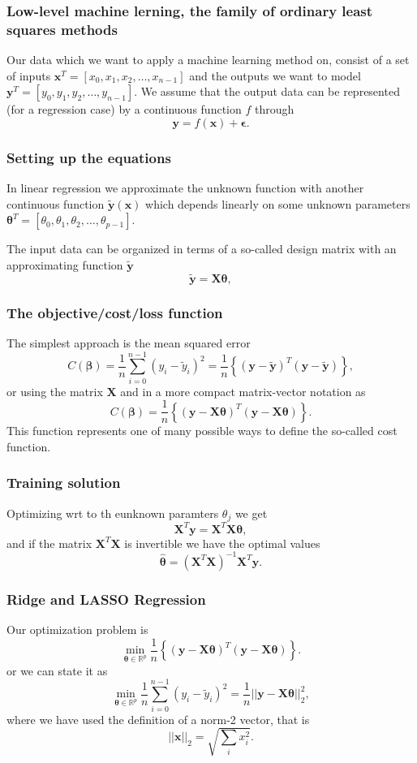 \documentclass{beamer}
\begin{document}
\begin{frame}
\frametitle{Low-level machine lerning, the family of ordinary least squares methods}

Our data which we want to apply a machine learning method on, consist
of a set of inputs $\bm{x}^T=[x_0,x_1,x_2,\dots,x_{n-1}]$ and the
outputs we want to model $\bm{y}^T=[y_0,y_1,y_2,\dots,y_{n-1}]$.
We assume  that the output data can be represented (for a regression case) by a continuous function $f$
through
\[
\bm{y}=f(\bm{x})+\bm{\epsilon}.
\]
\end{frame}

\begin{frame}
\frametitle{Setting up the equations}

In linear regression we approximate the unknown function with another
continuous function $\tilde{\bm{y}}(\bm{x})$ which depends linearly on
some unknown parameters
$\bm{\theta}^T=[\theta_0,\theta_1,\theta_2,\dots,\theta_{p-1}]$.

The input data can be organized in terms of a so-called design matrix 
with an approximating function $\bm{\tilde{y}}$ 
\[
\bm{\tilde{y}}= \bm{X}\bm{\theta},
\]
\end{frame}

\begin{frame}
\frametitle{The objective/cost/loss function}

The  simplest approach is the mean squared error
\[
C(\bm{\beta})=\frac{1}{n}\sum_{i=0}^{n-1}\left(y_i-\tilde{y}_i\right)^2=\frac{1}{n}\left\{\left(\bm{y}-\bm{\tilde{y}}\right)^T\left(\bm{y}-\bm{\tilde{y}}\right)\right\},
\]
or using the matrix $\bm{X}$ and in a more compact matrix-vector notation as
\[
C(\bm{\beta})=\frac{1}{n}\left\{\left(\bm{y}-\bm{X}\bm{\theta}\right)^T\left(\bm{y}-\bm{X}\bm{\theta}\right)\right\}.
\]
This function represents one of many possible ways to define the so-called cost function.
\end{frame}

\begin{frame}
\frametitle{Training solution}

Optimizing wrt to th eunknown paramters $\theta_j$ we get 
\[
\bm{X}^T\bm{y} = \bm{X}^T\bm{X}\bm{\theta},  
\]
and if the matrix $\bm{X}^T\bm{X}$ is invertible we have the optimal values
\[
\hat{\bm{\theta}} =\left(\bm{X}^T\bm{X}\right)^{-1}\bm{X}^T\bm{y}.
\]
\end{frame}

\begin{frame}
\frametitle{Ridge and LASSO Regression}

Our optimization problem is
\[
{\displaystyle \min_{\bm{\theta}\in {\mathbb{R}}^{p}}}\frac{1}{n}\left\{\left(\bm{y}-\bm{X}\bm{\theta}\right)^T\left(\bm{y}-\bm{X}\bm{\theta}\right)\right\}.
\]
or we can state it as
\[
{\displaystyle \min_{\bm{\theta}\in
{\mathbb{R}}^{p}}}\frac{1}{n}\sum_{i=0}^{n-1}\left(y_i-\tilde{y}_i\right)^2=\frac{1}{n}\vert\vert \bm{y}-\bm{X}\bm{\theta}\vert\vert_2^2,
\]
where we have used the definition of  a norm-2 vector, that is
\[
\vert\vert \bm{x}\vert\vert_2 = \sqrt{\sum_i x_i^2}. 
\]
\end{frame}
\end{document}
